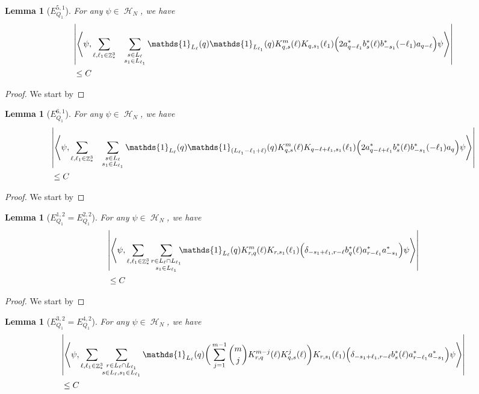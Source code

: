 \documentclass[sn-mathphys, Numbered ,a4paper]{sn-jnl}%
\DeclareMathOperator{\Z}{\mathbb{Z}}
\DeclareMathOperator{\HH}{\mathcal{H}}
\newcommand{\eva}[1]{\left\langle #1 \right\rangle}
\theoremstyle{plain}
\newtheorem{lemma}[theorem]{Lemma}
\theoremstyle{definition}
\theoremstyle{remark}
\theoremstyle{plain}
\theoremstyle{definition}
\theoremstyle{remark}
\begin{document}
\begin{lemma}[$E_{Q_1}^{5,1}$]
For any $\psi \in \HH_N$, we have
\begin{align}
	&\abs{\eva{\psi,\sum\limits_{\ell, \ell_1\in \Z^3_*} \!\quad \sum\limits_{ \substack{s \in L_{\ell} \\ s_1\in L_{\ell_1}}} \mathds{1}_{L_\ell}(q) \mathds{1}_{L_{\ell_1}}(q) K^{m}_{q,s}(\ell) K_{q,s_1}(\ell_1) \Big(       2a^*_{q-\ell_1} b^*_{s}(\ell) b^*_{-s_1}(-\ell_1) a_{q-\ell} \Big)   \psi}}\nonumber\\
	&\leq C
\end{align}
\end{lemma}
\begin{proof}
We start by
\end{proof}



\begin{lemma}[$E_{Q_1}^{6,1}$]
For any $\psi \in \HH_N$, we have
\begin{align}
	&\abs{\eva{\psi, \sum\limits_{\ell, \ell_1\in \Z^3_*}  \!\quad           \sum\limits_{\substack{s \in L_{\ell} \\ s_1 \in L_{\ell_1}}}\!\,  \mathds{1}_{L_\ell}(q) \mathds{1}_{(L_{\ell_1}-\ell_1+\ell)}(q) K^{m}_{q,s}(\ell) K_{q-\ell+\ell_1,s_1}(\ell_1)\Big( 2a^*_{q-\ell+\ell_1} b^*_{s}(\ell) b^*_{-s_1}(-\ell_1) a_{q}\Big)  \psi}}\nonumber\\&\leq C
\end{align}
\end{lemma}
\begin{proof}
We start by
\end{proof}

\begin{lemma}[$E_{Q_1}^{1,2}=E_{Q_1}^{2,2}$]
For any $\psi \in \HH_N$, we have
\begin{align}
	&\abs{\eva{\psi, \sum\limits_{\ell, \ell_1\in \Z^3_*}\sum\limits_{\substack{r \in L_{\ell}\cap  L_{\ell_1}\\s_1\in L_{\ell_1}}}\!\!\!\mathds{1}_{L_\ell}      (q) K^{m}_{r,q}(\ell)K_{r,s_1}(\ell_1)\Big(\delta_{-s_1+\ell_1,r-\ell} b^*_{q}(\ell) a^*_{r-\ell_1}a^*_{-s_1}\Big)   \psi}}\nonumber\\&\leq C
\end{align}
\end{lemma}
\begin{proof}
We start by
\end{proof}


\begin{lemma}[$E_{Q_1}^{3,2}=E_{Q_1}^{4,2} $]
	For any $\psi \in \HH_N$, we have
	\begin{align}
		&\abs{\eva{\psi, \sum\limits_{\ell, \ell_1\in \Z^3_*}\!\!
				\sum\limits_{\substack{r\in L_{\ell}\cap L_{\ell_1}\\s \in L_{\ell}, s_1\in L_{\ell_1}}}\mathds{1}_{L_\ell}(q) \bigg(\sum_{j=1}^{m-1}{{m}\choose j}K^{m-j}_{r,q}(\ell)K^{j}_{q,s}(\ell)\bigg)K_{r,s_1}(\ell_1)\Big(\delta_{-s_1+\ell_1,r-\ell} b^*_{s}(\ell) a^*_{r-\ell_1}a^*_{-s_1}\Big)  \psi}}\nonumber\\
		&\leq C
	\end{align}
\end{lemma}
\end{document}
